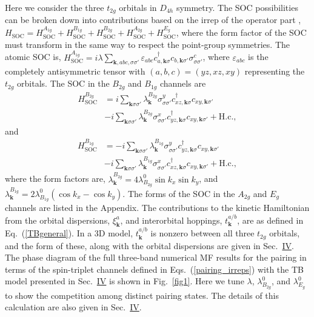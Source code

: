 \documentclass[%
reprint,
superscriptaddress,
 amsmath,amssymb,
 aps,
prb,
nobalancelastpage,
]{revtex4-2}
\begin{document}
Here we consider the three $t_{2g}$ orbitals in $D_{4h}$ symmetry. The SOC possibilities can be broken down into contributions based on the irrep of the operator part \cite{Ramires2019PRB}, $H_{\text{SOC}} = H_{\text{SOC}}^{A_{1g}} + H_{\text{SOC}}^{B_{1g}} + H_{\text{SOC}}^{B_{2g}} + H_{\text{SOC}}^{A_{2g}} + H_{\text{SOC}}^{E_{g}}$, where the form factor of the SOC must transform in the same way to respect the point-group symmetries. The atomic SOC is, $\displaystyle H_{\text{SOC}}^{A_{1g}} = i\lambda\sum_{\textbf{k},abc,\sigma\sigma'}\varepsilon_{abc}c_{a,\textbf{k}\sigma}^{\dagger}c_{b,\textbf{k}\sigma'}\sigma^{c}_{\sigma\sigma'}$, where $\varepsilon_{abc}$ is the completely antisymmetric tensor with $(a,b,c)=(yz,xz,xy)$ representing the $t_{2g}$ orbitals. The SOC in the $B_{2g}$ and $B_{1g}$ channels are
\begin{equation} \label{b2gSOC}
\begin{aligned}
    H_{\text{SOC}}^{B_{2g}} &= i\sum_{\textbf{k}\sigma\sigma'}\lambda_{\textbf{k}}^{B_{2g}} \sigma^{y}_{\sigma\sigma'}c^{\dagger}_{xz,\textbf{k}\sigma}c_{xy,\textbf{k}\sigma'} \\&-i\sum_{\textbf{k}\sigma\sigma'}\lambda_{\textbf{k}}^{B_{2g}} \sigma^{x}_{\sigma\sigma'}c^{\dagger}_{yz,\textbf{k}\sigma}c_{xy,\textbf{k}\sigma'} + \text{H.c.},
\end{aligned}
\end{equation}
and
\begin{equation} \label{b1gSOC}
\begin{aligned}
H_{\text{SOC}}^{B_{1g}} &= -i\sum_{\textbf{k}\sigma\sigma'}\lambda_{\textbf{k}}^{B_{1g}}\sigma^{y}_{\sigma\sigma'}c^{\dagger}_{yz,\textbf{k}\sigma}c_{xy,\textbf{k}\sigma'} \\ &-i\sum_{\textbf{k}\sigma\sigma'}\lambda_{\textbf{k}}^{B_{1g}}\sigma^{x}_{\sigma\sigma'}c^{\dagger}_{xz,\textbf{k}\sigma}c_{xy,\textbf{k}\sigma'} + \text{H.c.},
\end{aligned}
\end{equation}
where the form factors are, $\displaystyle \lambda_{\textbf{k}}^{B_{2g}}=4\lambda_{B_{2g}}^{0}\sin{k_x}\sin{k_y}$, and $\displaystyle \lambda_{\textbf{k}}^{B_{1g}} = 2\lambda_{B_{1g}}^{0}(\cos{k_x}-\cos{k_y})$. The forms of the SOC in the $A_{2g}$ and $E_{g}$ channels are listed in the Appendix. The contributions to the kinetic Hamiltonian from the orbital dispersions, $\xi_{\textbf{k}}^{a}$, and interorbital hoppings, $t_{\textbf{k}}^{a/b}$, are as defined in Eq.~(\ref{TBgeneral}). In a 3D model, $t_{\textbf{k}}^{a/b}$ is nonzero between all three $t_{2g}$ orbitals, and the form of these, along with the orbital dispersions are given in Sec.~\hyperref[Four]{IV}. The phase diagram of the full three-band numerical MF results for the pairing in terms of the spin-triplet channels defined in Eqs.~(\ref{pairing_irreps}) with the TB model presented in Sec.~\hyperref[Four]{IV} is shown in Fig.~\ref{fig1}. Here we tune $\lambda$, $\lambda_{B_{2g}}^{0}$, and $\lambda_{E_{g}}^{0}$ to show the competition among distinct pairing states. The details of this calculation are also given in Sec.~\hyperref[Four]{IV}.
\end{document}
